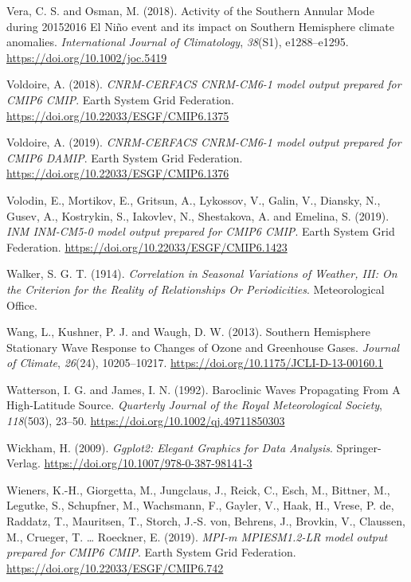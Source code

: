 \documentclass[12pt,oneside,a4paper]{reedthesis}
\newlength{\cslhangindent}
\newenvironment{CSLReferences}[2] %
 {%
  \setlength{\parindent}{0pt}
  \ifodd #1 \everypar{\setlength{\hangindent}{\cslhangindent}}\ignorespaces\fi
  \ifnum #2 > 0
  \setlength{\parskip}{#2\baselineskip}
  \fi
 }%
 {}
\begin{document}
\begin{CSLReferences}{1}{0}
\leavevmode{}%
Vera, C. S. and Osman, M. (2018). Activity of the {Southern Annular Mode} during 2015{\textendash}2016 {El Ni{ñ}o} event and its impact on {Southern Hemisphere} climate anomalies. \emph{International Journal of Climatology}, \emph{38}(S1), e1288--e1295. \url{https://doi.org/10.1002/joc.5419}

\leavevmode{}%
Voldoire, A. (2018). \emph{CNRM-CERFACS CNRM-CM6-1 model output prepared for CMIP6 CMIP}. Earth System Grid Federation. \url{https://doi.org/10.22033/ESGF/CMIP6.1375}

\leavevmode{}%
Voldoire, A. (2019). \emph{CNRM-CERFACS CNRM-CM6-1 model output prepared for CMIP6 DAMIP}. Earth System Grid Federation. \url{https://doi.org/10.22033/ESGF/CMIP6.1376}

\leavevmode{}%
Volodin, E., Mortikov, E., Gritsun, A., Lykossov, V., Galin, V., Diansky, N., Gusev, A., Kostrykin, S., Iakovlev, N., Shestakova, A. and Emelina, S. (2019). \emph{INM INM-CM5-0 model output prepared for CMIP6 CMIP}. Earth System Grid Federation. \url{https://doi.org/10.22033/ESGF/CMIP6.1423}

\leavevmode{}%
Walker, S. G. T. (1914). \emph{Correlation in {Seasonal Variations} of {Weather}, {III}: {On} the {Criterion} for the {Reality} of {Relationships Or Periodicities}}. {Meteorological Office}.

\leavevmode{}%
Wang, L., Kushner, P. J. and Waugh, D. W. (2013). Southern {Hemisphere Stationary Wave Response} to {Changes} of {Ozone} and {Greenhouse Gases}. \emph{Journal of Climate}, \emph{26}(24), 10205--10217. \url{https://doi.org/10.1175/JCLI-D-13-00160.1}

\leavevmode{}%
Watterson, I. G. and James, I. N. (1992). Baroclinic {Waves Propagating From A High-Latitude Source}. \emph{Quarterly Journal of the Royal Meteorological Society}, \emph{118}(503), 23--50. \url{https://doi.org/10.1002/qj.49711850303}

\leavevmode{}%
Wickham, H. (2009). \emph{Ggplot2: {Elegant Graphics} for {Data Analysis}}. {Springer-Verlag}. \url{https://doi.org/10.1007/978-0-387-98141-3}

\leavevmode{}%
Wieners, K.-H., Giorgetta, M., Jungclaus, J., Reick, C., Esch, M., Bittner, M., Legutke, S., Schupfner, M., Wachsmann, F., Gayler, V., Haak, H., Vrese, P. de, Raddatz, T., Mauritsen, T., Storch, J.-S. von, Behrens, J., Brovkin, V., Claussen, M., Crueger, T. \ldots{} Roeckner, E. (2019). \emph{MPI-m MPIESM1.2-LR model output prepared for CMIP6 CMIP}. Earth System Grid Federation. \url{https://doi.org/10.22033/ESGF/CMIP6.742}


\end{CSLReferences}
\end{document}
